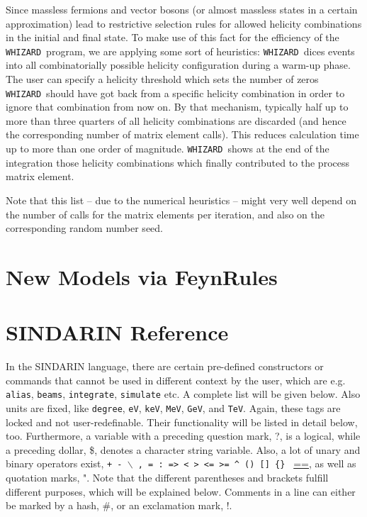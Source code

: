 \documentclass[12pt]{book}
\newcommand{\ttt}[1]{\texttt{#1}}
\newcommand{\whizard}{\texttt{WHIZARD}}
\begin{document}
Since massless fermions and vector bosons (or almost massless states
in a certain approximation) lead to restrictive selection rules for
allowed helicity combinations in the initial and final state. To make
use of this fact for the efficiency of the \whizard\ program, we are
applying some sort of heuristics: \whizard\ dices events into all
combinatorially possible helicity configuration during a warm-up
phase. The user can specify a helicity threshold which sets the number
of zeros \whizard\ should have got back from a specific helicity
combination in order to ignore that combination from now on. By that
mechanism, typically half up to more than three quarters of all
helicity combinations are discarded (and hence the corresponding
number of matrix element calls). This reduces calculation time up to
more than one order of magnitude. \whizard\ shows at the end of the
integration those helicity combinations which finally contributed to
the process matrix element.

Note that this list -- due to the numerical heuristics -- might very
well depend on the number of calls for the matrix elements per
iteration, and also on the corresponding random number seed.  


\chapter{New Models via FeynRules}
\label{chap:feynrules}


\appendix

\chapter{SINDARIN Reference}

\medskip

In the SINDARIN language, there are certain pre-defined constructors or
commands that cannot be used in different context by the user, which
are e.g. \ttt{alias}, \ttt{beams}, \ttt{integrate}, \ttt{simulate} etc.
A complete list will be given below. Also units are fixed, like
\ttt{degree}, \ttt{eV}, \ttt{keV},  
\ttt{MeV}, \ttt{GeV}, and \ttt{TeV}. Again, these tags are locked and
not user-redefinable. Their functionality will be listed in detail
below, too. Furthermore, a variable with a preceding
question mark, ?, is a logical, while a preceding dollar, \$, denotes a
character string variable.  Also, a lot of unary and binary operators
exist, \ttt{+ - $\backslash$ , = : => < > <= >= \^ \;  () [] \{\} }
\url{==}, as well as quotation marks, ". Note that the
different parentheses and brackets fulfill different purposes, which
will be explained below. Comments in a line can either be marked by a
hash, \#, or an exclamation mark, !.   
\end{document}
